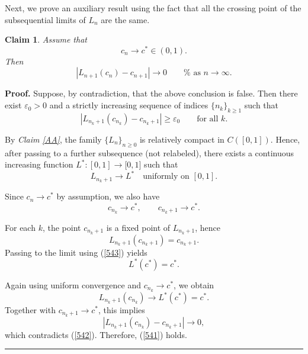 \documentclass[onecolumn]{article}
\newtheorem{claim}[theorem]{Claim}
\newenvironment{proof}[1][Proof]{\noindent\textbf{#1.} }{\ \rule{0.5em}{0.5em}}
\begin{document}
Next, we prove an auxiliary result using the fact that all the crossing
point of the subsequential limits of $L_{n}$ are the same.

\begin{claim}
\noindent \label{Ln-cn-shift} Assume that 
\begin{equation}
c_{n}\longrightarrow c^{\ast }\in (0,1).  \label{541a}
\end{equation}%
Then 
\begin{equation}
\left\vert L_{n+1}(c_{n})-c_{n+1}\right\vert \longrightarrow 0\qquad \text{%
as }n\rightarrow \infty .  \label{541}
\end{equation}
\end{claim}

\begin{proof}
Suppose, by contradiction, that the above conclusion is false. Then there
exist $\varepsilon _{0}>0$ and a strictly increasing sequence of indices $%
\{n_{k}\}_{k\geq 1}$ such that 
\begin{equation}
\left\vert L_{n_{k}+1}(c_{n_{k}})-c_{n_{k}+1}\right\vert \geq \varepsilon
_{0}\qquad \text{for all }k.  \label{542}
\end{equation}

By \textit{Claim \ref{AA}}, the family $\{L_{n}\}_{n\geq 0}$ is relatively
compact in $C([0,1])$. Hence, after passing to a further subsequence (not
relabeled), there exists a continuous increasing function $L^{\ast
}:[0,1]\rightarrow \lbrack 0,1]$ such that 
\begin{equation}
L_{n_{k}+1}\longrightarrow L^{\ast }\quad \text{uniformly on }[0,1].
\label{543}
\end{equation}

Since $c_{n}\rightarrow c^{\ast }$ by assumption, we also have 
\begin{equation}
c_{n_{k}}\longrightarrow c^{\ast },\qquad c_{n_{k}+1}\longrightarrow c^{\ast
}.  \label{544}
\end{equation}

For each $k$, the point $c_{n_{k}+1}$ is a fixed point of $L_{n_{k}+1}$,
hence 
\begin{equation}
L_{n_{k}+1}(c_{n_{k}+1})=c_{n_{k}+1}.  \label{544a}
\end{equation}%
Passing to the limit using (\ref{543}) yields 
\begin{equation}
L^{\ast }(c^{\ast })=c^{\ast }.  \label{544b}
\end{equation}

Again using uniform convergence and $c_{n_{k}}\rightarrow c^{\ast }$, we
obtain 
\begin{equation}
L_{n_{k}+1}(c_{n_{k}})\longrightarrow L^{\ast }(c^{\ast })=c^{\ast }.
\label{545c}
\end{equation}%
Together with $c_{n_{k}+1}\rightarrow c^{\ast }$, this implies 
\begin{equation}
\left\vert L_{n_{k}+1}(c_{n_{k}})-c_{n_{k}+1}\right\vert \longrightarrow 0,
\label{545d}
\end{equation}%
which contradicts (\ref{542}). Therefore, (\ref{541}) holds.
\end{proof}
\end{document}
